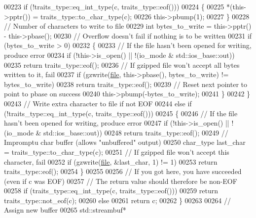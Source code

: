 \begin{DoxyCode}
{00223     \textcolor{keywordflow}{if} (!traits\_type::eq\_int\_type(c, traits\_type::eof()))
00224     \{
00225       *(this->pptr()) = traits\_type::to\_char\_type(c);
00226       this->pbump(1);
00227     \}
00228     \textcolor{comment}{// Number of characters to write to file}
00229     \textcolor{keywordtype}{int} bytes\_to\_write = this->pptr() - this->pbase();
00230     \textcolor{comment}{// Overflow doesn't fail if nothing is to be written}
00231     \textcolor{keywordflow}{if} (bytes\_to\_write > 0)
00232     \{
00233       \textcolor{comment}{// If the file hasn't been opened for writing, produce error}
00234       \textcolor{keywordflow}{if} (!this->is\_open() || !(io\_mode & std::ios\_base::out))
00235         \textcolor{keywordflow}{return} traits\_type::eof();
00236       \textcolor{comment}{// If gzipped file won't accept all bytes written to it, fail}
00237       \textcolor{keywordflow}{if} (gzwrite(\hyperlink{structfile}{file}, this->pbase(), bytes\_to\_write) != bytes\_to\_write)
00238         \textcolor{keywordflow}{return} traits\_type::eof();
00239       \textcolor{comment}{// Reset next pointer to point to pbase on success}
00240       this->pbump(-bytes\_to\_write);
00241     \}
00242   \}
00243   \textcolor{comment}{// Write extra character to file if not EOF}
00244   \textcolor{keywordflow}{else} \textcolor{keywordflow}{if} (!traits\_type::eq\_int\_type(c, traits\_type::eof()))
00245   \{
00246     \textcolor{comment}{// If the file hasn't been opened for writing, produce error}
00247     \textcolor{keywordflow}{if} (!this->is\_open() || !(io\_mode & std::ios\_base::out))
00248       \textcolor{keywordflow}{return} traits\_type::eof();
00249     \textcolor{comment}{// Impromptu char buffer (allows "unbuffered" output)}
00250     char\_type last\_char = traits\_type::to\_char\_type(c);
00251     \textcolor{comment}{// If gzipped file won't accept this character, fail}
00252     \textcolor{keywordflow}{if} (gzwrite(\hyperlink{structfile}{file}, &last\_char, 1) != 1)
00253       \textcolor{keywordflow}{return} traits\_type::eof();
00254   \}
00255 
00256   \textcolor{comment}{// If you got here, you have succeeded (even if c was EOF)}
00257   \textcolor{comment}{// The return value should therefore be non-EOF}
00258   \textcolor{keywordflow}{if} (traits\_type::eq\_int\_type(c, traits\_type::eof()))
00259     \textcolor{keywordflow}{return} traits\_type::not\_eof(c);
00260   \textcolor{keywordflow}{else}
00261     \textcolor{keywordflow}{return} c;
00262 \}
00263 
00264 \textcolor{comment}{// Assign new buffer}
00265 std::streambuf*
}
\end{DoxyCode}
